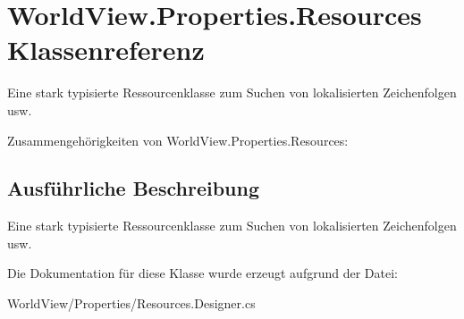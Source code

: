 \hypertarget{class_world_view_1_1_properties_1_1_resources}{
\section{WorldView.Properties.Resources Klassenreferenz}
\label{class_world_view_1_1_properties_1_1_resources}
}


Eine stark typisierte Ressourcenklasse zum Suchen von lokalisierten Zeichenfolgen usw.  




Zusammengehörigkeiten von WorldView.Properties.Resources:

\subsection{Ausführliche Beschreibung}
Eine stark typisierte Ressourcenklasse zum Suchen von lokalisierten Zeichenfolgen usw. 

Die Dokumentation für diese Klasse wurde erzeugt aufgrund der Datei:\begin{DoxyCompactItemize}
\item 
WorldView/Properties/Resources.Designer.cs\end{DoxyCompactItemize}
